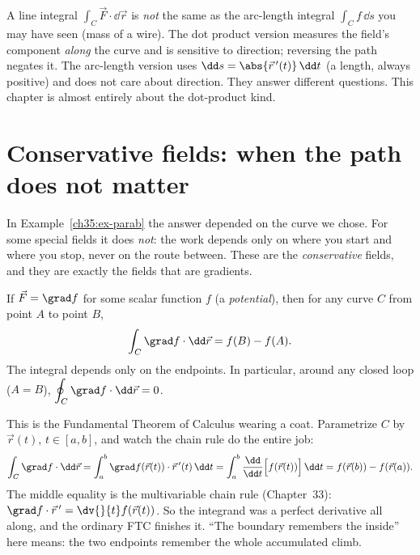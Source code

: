 \begin{trapbox}
A line integral $\int_C \vec F\cdot\dd\vec r$ is \emph{not} the same as the
arc-length integral $\int_C f\,\dd s$ you may have seen (mass of a wire). The dot
product version measures the field's component \emph{along} the curve and is
sensitive to direction; reversing the path negates it. The arc-length version uses
$\dd s = \abs{\vec r\,'(t)}\,\dd t$ (a length, always positive) and does not care
about direction. They answer different questions. This chapter is almost entirely
about the dot-product kind.
\end{trapbox}

\section{Conservative fields: when the path does not matter}
\label{ch35:conservative}

In Example~\ref{ch35:ex-parab} the answer depended on the curve we chose. For some
special fields it does \emph{not}: the work depends only on where you start and
where you stop, never on the route between. These are the \emph{conservative}
fields, and they are exactly the fields that are gradients.

\begin{theorem}
\label{ch35:thm-gradient}
If $\vec F = \grad f$ for some scalar function $f$ (a \emph{potential}), then for
any curve $C$ from point $A$ to point $B$,
\[
  \int_C \grad f\cdot \dd\vec r = f(B) - f(A).
\]
The integral depends only on the endpoints. In particular, around any closed loop
($A=B$), $\displaystyle\oint_C \grad f\cdot\dd\vec r = 0$.
\end{theorem}

\begin{whybox}
This is the Fundamental Theorem of Calculus wearing a coat. Parametrize $C$ by
$\vec r(t)$, $t\in[a,b]$, and watch the chain rule do the entire job:
\[
  \int_C \grad f\cdot\dd\vec r
  = \int_a^b \grad f(\vec r(t))\cdot \vec r\,'(t)\,\dd t
  = \int_a^b \frac{\dd}{\dd t}\Big[f(\vec r(t))\Big]\,\dd t
  = f(\vec r(b)) - f(\vec r(a)).
\]
The middle equality is the multivariable chain rule (Chapter~33):
$\grad f\cdot\vec r\,' = \dv{}{t}f(\vec r(t))$. So the integrand was a perfect
derivative all along, and the ordinary FTC finishes it. ``The boundary remembers
the inside'' here means: the two endpoints remember the whole accumulated climb.
\end{whybox}

